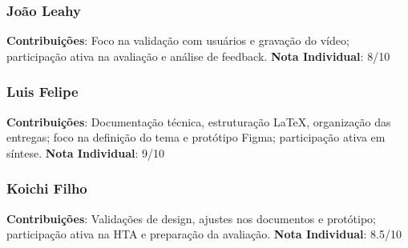 \documentclass[12pt, a4paper]{report}
\begin{document}
\subsubsection{João Leahy}
\textbf{Contribuições}: Foco na validação com usuários e gravação do vídeo; participação ativa na avaliação e análise de feedback.
\textbf{Nota Individual}: 8/10

\subsubsection{Luis Felipe}
\textbf{Contribuições}: Documentação técnica, estruturação LaTeX, organização das entregas; foco na definição do tema e protótipo Figma; participação ativa em síntese.
\textbf{Nota Individual}: 9/10

\subsubsection{Koichi Filho}
\textbf{Contribuições}: Validações de design, ajustes nos documentos e protótipo; participação ativa na HTA e preparação da avaliação.
\textbf{Nota Individual}: 8.5/10
\end{document}
